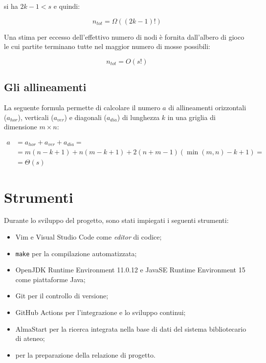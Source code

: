 \documentclass{article}
\begin{document}
si ha $2k - 1 < s$ e quindi:

\begin{equation}
  n_{tot} = \varOmega((2k - 1)!)
\end{equation}

Una stima per eccesso dell'effettivo numero di nodi è fornita dall'albero di
gioco le cui partite terminano tutte nel maggior numero di mosse possibili:

\begin{equation}
  n_{tot} = O(s!)
\end{equation}

\subsection{Gli allineamenti}

La seguente formula permette di calcolare il numero $a$ di allineamenti
orizzontali ($a_{hor}$), verticali ($a_{ver}$) e diagonali ($a_{dia}$) di
lunghezza $k$ in una griglia di dimensione $m \times n$:

\begin{equation}
\begin{split}
  a & = a_{hor} + a_{ver} + a_{dia} = \\
  & = m (n - k + 1) + n (m - k + 1) + 2 (n + m - 1) (\min(m, n) - k + 1) = \\
  & = \varTheta(s)
\end{split}
\end{equation}

\section{Strumenti}

Durante lo sviluppo del progetto, sono stati impiegati i seguenti strumenti:

\begin{itemize}
  \item Vim e Visual Studio Code come \emph{editor} di codice;
  \item \verb!make! per la compilazione automatizzata; 
  \item OpenJDK Runtime Environment 11.0.12 e Java\texttrademark SE Runtime
    Environment 15 come piattaforme Java;
  \item Git per il controllo di versione;
  \item GitHub Actions per l'integrazione e lo sviluppo continui;
  \item AlmaStart per la ricerca integrata nella base di dati del sistema
    bibliotecario di ateneo;
  \item \LaTeXe{} per la preparazione della relazione di progetto.
\end{itemize}
\end{document}
